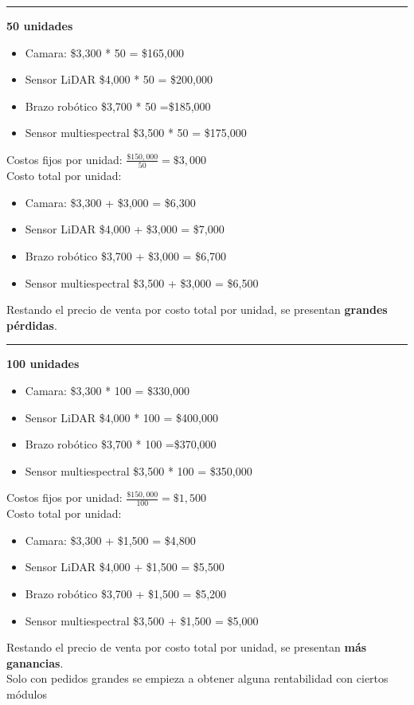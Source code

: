 \documentclass[letterpaper,12pt]{article}
\begin{document}
\begin{sloppypar}
\begin{itemize}
\begin{center}
        \hrule
        \textbf{50 unidades }
            \begin{itemize}
                \centering
                \item Camara: \$3,300 * 50 = \$165,000
                \item Sensor LiDAR \$4,000 * 50 = \$200,000
                \item Brazo robótico \$3,700 * 50 =\$185,000
                \item Sensor multiespectral \$3,500 * 50 = \$175,000
            \end{itemize}
            Costos fijos por unidad: $\displaystyle\frac{\$150,000}{50} = \$3,000$
            \vspace{0.3cm}\\ 
            Costo total por unidad:
            \begin{itemize}
                \centering
                \item Camara: \$3,300 + \$3,000 = \$6,300
                \item Sensor LiDAR \$4,000 + \$3,000 = \$7,000
                \item Brazo robótico \$3,700 + \$3,000 = \$6,700
                \item Sensor multiespectral \$3,500 + \$3,000 = \$6,500
            \end{itemize} 
            Restando el precio de venta por costo total por unidad, se presentan \textbf{grandes pérdidas}.
            \hrule
            \textbf{100 unidades }
            \begin{itemize}
                \centering
                \item Camara: \$3,300 * 100 = \$330,000
                \item Sensor LiDAR \$4,000 * 100 = \$400,000
                \item Brazo robótico \$3,700 * 100 =\$370,000
                \item Sensor multiespectral \$3,500 * 100 = \$350,000
            \end{itemize}
            Costos fijos por unidad: $\displaystyle\frac{\$150,000}{100} = \$1,500$
            \vspace{0.3cm}\\ 
            Costo total por unidad:
            \begin{itemize}
                \centering
                \item Camara: \$3,300 + \$1,500 = \$4,800
                \item Sensor LiDAR \$4,000 + \$1,500 = \$5,500
                \item Brazo robótico \$3,700 + \$1,500 = \$5,200
                \item Sensor multiespectral \$3,500 + \$1,500 = \$5,000
            \end{itemize} 
            Restando el precio de venta por costo total por unidad, se presentan \textbf{más ganancias}. \\ Solo con pedidos grandes se empieza a obtener alguna rentabilidad con ciertos módulos
    \end{center}


\end{itemize}
\end{sloppypar}
\end{document}

